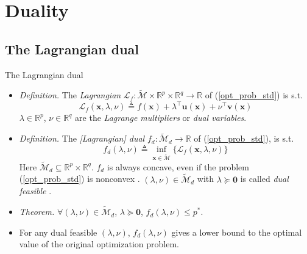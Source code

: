 \documentclass{beamer}
\numberwithin{equation}{section}
\newcommand{\aref}[1]{\alert{\ref{#1}}}
\begin{document}
\section{Duality}

\subsection{The Lagrangian dual}

\begin{frame}{The Lagrangian dual}
    \begin{itemize}
        \item
        \textit{Definition.} The \textit{Lagrangian} $ \mathcal{L}_f :
        \tilde{\mathcal{M}} \times \mathbb{R}^p \times \mathbb{R}^q \rightarrow
        \mathbb{R} $ of (\aref{opt_prob_std}) is s.t.
        \begin{equation} \label{std_lagrangian}
            \mathcal{L}_f(\mathbf{x}, \lambda, \nu) \triangleq f(\mathbf{x}) +
            \lambda^\top\mathbf{u}(\mathbf{x}) + \nu^\top\mathbf{v}(\mathbf{x})
        \end{equation}
        $ \lambda \in \mathbb{R}^p $, $ \nu \in \mathbb{R}^q $ are the
        \textit{Lagrange multipliers} or \textit{dual variables}.

        \item
        \textit{Definition.} The \textit{[Lagrangian] dual} $ f_d :
        \tilde{\mathcal{M}}_d \rightarrow \mathbb{R} $ of 
        (\aref{opt_prob_std}), is s.t.
        \begin{equation} \label{std_dual}
            f_d(\lambda, \nu) \triangleq
            \inf_{\mathbf{x} \in \tilde{\mathcal{M}}}
            \{\mathcal{L}_f(\mathbf{x}, \lambda, \nu)\}
        \end{equation}
        Here $ \tilde{\mathcal{M}}_d \subseteq \mathbb{R}^p \times
        \mathbb{R}^q $. $ f_d $ is \alert{always} concave, even if the
        problem (\aref{opt_prob_std}) is nonconvex \cite{bv_convex_opt}.
        $ (\lambda, \nu) \in \tilde{\mathcal{M}}_d $ with $ \lambda \succeq
        \mathbf{0} $ is called \textit{dual feasible} \cite{bv_convex_opt}.

        \item
        \textit{Theorem.} $ \forall (\lambda, \nu) \in \tilde{\mathcal{M}}_d $,
        $ \lambda \succeq \mathbf{0} $, $ f_d(\lambda, \nu) \le p^* $.

        \item
        For any dual feasible $ (\lambda, \nu) $, $ f_d(\lambda, \nu) $
        gives a lower bound to the optimal value of the original optimization
        problem.
    \end{itemize}

    \medskip
\end{frame}
\end{document}
